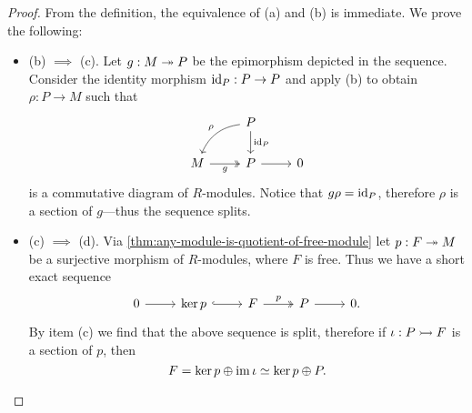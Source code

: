 \begin{proof}
    From the definition, the equivalence of (a) and (b) is immediate. We prove the
    following:
    \begin{itemize}\setlength\itemsep{0em}
        \item (b) \(\implies\) (c). Let \(g: M \twoheadrightarrow P\) be the epimorphism depicted in
              the sequence. Consider the identity morphism \(\operatorname{id}_P: P \to P\) and apply (b)
              to obtain \(\rho: P \to M\) such that
              \[
                  \begin{tikzcd}
                      &P \ar[d, "\Id_P"] \ar[ld, "\rho"', bend right] & \\
                      M \ar[r, "g"', two heads] &P \ar[r] &0
                  \end{tikzcd}
              \]
              is a commutative diagram of \(R\)-modules. Notice that \(g \rho = \operatorname{id}_P\),
              therefore \(\rho\) is a section of \(g\)---thus the sequence splits.

        \item (c) \(\implies\) (d). Via
              \cref{thm:any-module-is-quotient-of-free-module} let \(p: F \twoheadrightarrow M\) be a
              surjective morphism of \(R\)-modules, where \(F\) is free. Thus we have a
              short exact sequence
              \[
                  \begin{tikzcd}
                      0 \ar[r] &\ker p \ar[r, hook] &F \ar[r, "p", two heads] &P \ar[r] &0.
                  \end{tikzcd}
              \]
              By item (c) we find that the above sequence is split, therefore if \(\iota: P
              \rightarrowtail F\) is a section of \(p\), then
              \[
                  F = \ker p \oplus \operatorname{im} \iota \simeq \ker p \oplus P.
              \]


\end{itemize}
\end{proof}
